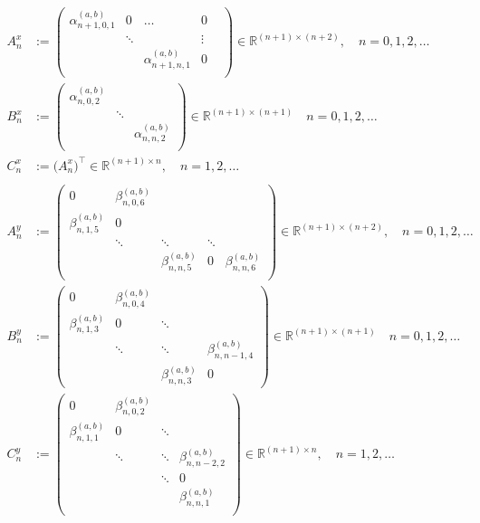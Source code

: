 \documentclass[11pt, oneside]{article}   	%
\newcommand{\R}{\mathbb{R}}
\newcommand{\alphaab}{\alpha^{(a,b)}}
\newcommand{\betaab}{\beta^{(a,b)}}
\begin{document}
\begin{align}
A^x_n &:= \begin{pmatrix}
		\alphaab_{n+1,0,1} & 0 & \hdots & 0 \\
		& \ddots & & \vdots & \\
		& & \alphaab_{n+1,n,1} & 0 \\
	    \end{pmatrix} \in \R^{(n+1)\times(n+2)}, \quad n = 0,1,2,\dots \\
B^x_n &:= \begin{pmatrix}
		\alphaab_{n,0,2} & & \\
		& \ddots & \\
		& & \alphaab_{n,n,2} \\
	    \end{pmatrix} \in \R^{(n+1)\times(n+1)} \quad n = 0,1,2,\dots \\
C^x_n &:= \big( A^x_n \big)^\top \in \R^{(n+1)\times n},  \quad n = 1,2,\dots \\ 
\nonumber \\
A^y_n &:= \begin{pmatrix}
		0 & \betaab_{n,0,6} & & & \\
		\betaab_{n,1,5} & 0 & & & \\
		& \ddots & \ddots & \ddots & \\
		& & \betaab_{n,n,5}& 0 & \betaab_{n,n,6} \\
	    \end{pmatrix} \in \R^{(n+1)\times(n+2)}, \quad n = 0,1,2,\dots \\
B^y_n &:= \begin{pmatrix}
		0 & \betaab_{n,0,4} & & \\
		\betaab_{n,1,3} & 0 & \ddots & \\
		& \ddots & \ddots & \betaab_{n,n-1,4} \\
		& & \betaab_{n,n,3} & 0
	    \end{pmatrix} \in \R^{(n+1)\times(n+1)}  \quad n = 0,1,2,\dots \\
C^y_n &:= \begin{pmatrix}
		0 & \betaab_{n,0,2} & & \\
		\betaab_{n,1,1} & 0 & \ddots & \\
		& \ddots & \ddots & \betaab_{n,n-2,2} \\
		& & \ddots & 0 \\
		& & & \betaab_{n,n,1} \\
	    \end{pmatrix} \in \R^{(n+1)\times n}, \quad n = 1,2,\dots
\end{align}
\end{document}
